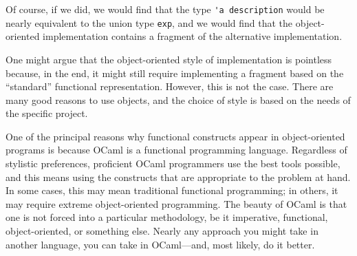 Of course, if we did, we would find that the type
\hbox{\lstinline$'a description$}
would be nearly equivalent to the union type \hbox{\lstinline$exp$}, and we
would find that the object-oriented implementation contains a fragment
of the alternative implementation.

One might argue that the object-oriented style of implementation is
pointless because, in the end, it might still require implementing a
fragment based on the ``standard'' functional representation.
However, this is not the case.  There are many good reasons to use
objects, and the choice of style is based on the needs of the specific
project.

One of the principal reasons why functional constructs appear in
object-oriented programs is because OCaml is a functional programming
language.  Regardless of stylistic preferences, proficient OCaml
programmers use the best tools possible, and this means using the
constructs that are appropriate to the problem at hand.  In some
cases, this may mean traditional functional programming; in others, it
may require extreme object-oriented programming.  The beauty of OCaml
is that one is not forced into a particular methodology, be it
imperative, functional, object-oriented, or something else.  Nearly
any approach you might take in another language, you can take in
OCaml---and, most likely, do it better.

